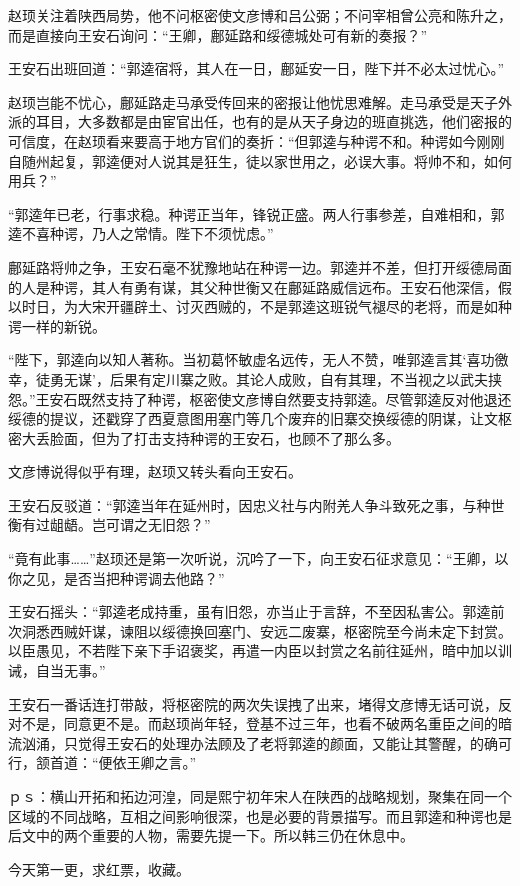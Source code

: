 赵顼关注着陕西局势，他不问枢密使文彦博和吕公弼；不问宰相曾公亮和陈升之，而是直接向王安石询问：“王卿，鄜延路和绥德城处可有新的奏报？”

王安石出班回道：“郭逵宿将，其人在一日，鄜延安一日，陛下并不必太过忧心。”

赵顼岂能不忧心，鄜延路走马承受传回来的密报让他忧思难解。走马承受是天子外派的耳目，大多数都是由宦官出任，也有的是从天子身边的班直挑选，他们密报的可信度，在赵顼看来要高于地方官们的奏折：“但郭逵与种谔不和。种谔如今刚刚自随州起复，郭逵便对人说其是狂生，徒以家世用之，必误大事。将帅不和，如何用兵？”

“郭逵年已老，行事求稳。种谔正当年，锋锐正盛。两人行事参差，自难相和，郭逵不喜种谔，乃人之常情。陛下不须忧虑。”

鄜延路将帅之争，王安石毫不犹豫地站在种谔一边。郭逵并不差，但打开绥德局面的人是种谔，其人有勇有谋，其父种世衡又在鄜延路威信远布。王安石他深信，假以时日，为大宋开疆辟土、讨灭西贼的，不是郭逵这班锐气褪尽的老将，而是如种谔一样的新锐。

“陛下，郭逵向以知人著称。当初葛怀敏虚名远传，无人不赞，唯郭逵言其‘喜功徼幸，徒勇无谋’，后果有定川寨之败。其论人成败，自有其理，不当视之以武夫挟怨。”王安石既然支持了种谔，枢密使文彦博自然要支持郭逵。尽管郭逵反对他退还绥德的提议，还戳穿了西夏意图用塞门等几个废弃的旧寨交换绥德的阴谋，让文枢密大丢脸面，但为了打击支持种谔的王安石，也顾不了那么多。

文彦博说得似乎有理，赵顼又转头看向王安石。

王安石反驳道：“郭逵当年在延州时，因忠义社与内附羌人争斗致死之事，与种世衡有过龃龉。岂可谓之无旧怨？”

“竟有此事……”赵顼还是第一次听说，沉吟了一下，向王安石征求意见：“王卿，以你之见，是否当把种谔调去他路？”

王安石摇头：“郭逵老成持重，虽有旧怨，亦当止于言辞，不至因私害公。郭逵前次洞悉西贼奸谋，谏阻以绥德换回塞门、安远二废寨，枢密院至今尚未定下封赏。以臣愚见，不若陛下亲下手诏褒奖，再遣一内臣以封赏之名前往延州，暗中加以训诫，自当无事。”

王安石一番话连打带敲，将枢密院的两次失误拽了出来，堵得文彦博无话可说，反对不是，同意更不是。而赵顼尚年轻，登基不过三年，也看不破两名重臣之间的暗流汹涌，只觉得王安石的处理办法顾及了老将郭逵的颜面，又能让其警醒，的确可行，颔首道：“便依王卿之言。”

ｐｓ：横山开拓和拓边河湟，同是熙宁初年宋人在陕西的战略规划，聚集在同一个区域的不同战略，互相之间影响很深，也是必要的背景描写。而且郭逵和种谔也是后文中的两个重要的人物，需要先提一下。所以韩三仍在休息中。

今天第一更，求红票，收藏。

